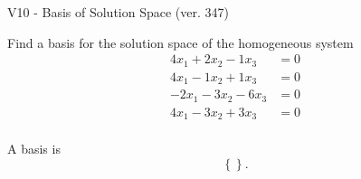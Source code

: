 \begin{exercise}
  \begin{exerciseTitle}V10 - Basis of Solution Space (ver. 347)\end{exerciseTitle}
  \begin{exerciseStatement}
    Find a basis for the solution space of the homogeneous system 
\begin{align*}
 4 x_ 1 + 2 x_ 2 -1 x_ 3 &= 0  \\ 
  4 x_ 1 -1 x_ 2 + 1 x_ 3 &= 0  \\ 
  -2 x_ 1 -3 x_ 2 -6 x_ 3 &= 0  \\ 
  4 x_ 1 -3 x_ 2 + 3 x_ 3 &= 0  \\ 
 \end{align*}


 
  \end{exerciseStatement}

  \begin{exerciseAnswer}
   A basis is   
\[\left\{\right\}.\]

  


  \end{exerciseAnswer}
\end{exercise}
